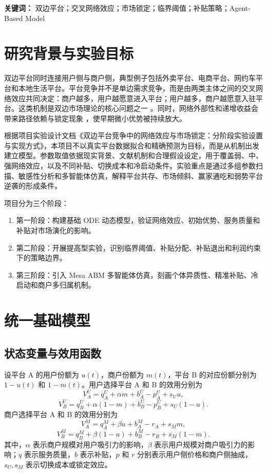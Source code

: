 \documentclass[UTF8,zihao=-4]{ctexart}
\begin{document}
\noindent\textbf{关键词：} 双边平台；交叉网络效应；市场锁定；临界阈值；补贴策略；Agent-Based Model

\section{研究背景与实验目标}

双边平台同时连接用户侧与商户侧，典型例子包括外卖平台、电商平台、网约车平台和本地生活平台。平台竞争并不是单边需求竞争，而是由两类主体之间的交叉网络效应共同决定：商户越多，用户越愿意进入平台；用户越多，商户越愿意入驻平台。这类机制是双边市场理论的核心问题之一 \cite{rochet2003,armstrong2006,parker2005}。同时，网络外部性和递增收益会带来路径依赖与锁定现象 \cite{katz1985,arthur1989}，使早期微小优势被持续放大。

根据项目实验设计文档《双边平台竞争中的网络效应与市场锁定：分阶段实验设置与实现方式》，本项目不以真实平台数据拟合和精确预测为目标，而是从机制出发建立模型。参数取值依据现实背景、文献机制和合理假设设定，用于覆盖弱、中、强网络效应，以及不同补贴、切换成本和冷启动条件。实验重点是通过多组参数扫描、敏感性分析和多智能体仿真，解释平台共存、市场倾斜、赢家通吃和弱势平台逆袭的形成条件。

项目分为三个阶段：
\begin{enumerate}
  \item 第一阶段：构建基础 ODE 动态模型，验证网络效应、初始优势、服务质量和补贴对市场演化的影响。
  \item 第二阶段：开展提高型实验，识别临界阈值、补贴分配、补贴退出和利润约束下的策略边界。
  \item 第三阶段：引入 Mesa ABM 多智能体仿真，刻画个体异质性、精准补贴、冷启动和商户多归属机制。
\end{enumerate}

\section{统一基础模型}

\subsection{状态变量与效用函数}

设平台 A 的用户份额为 $u(t)$，商户份额为 $m(t)$，平台 B 的对应份额分别为 $1-u(t)$ 和 $1-m(t)$。用户选择平台 A 和 B 的效用分别为
\begin{equation}
V_A^U=q_A^U+\alpha m+b_A^U-p_A^U+s_Uu,
\end{equation}
\begin{equation}
V_B^U=q_B^U+\alpha(1-m)+b_B^U-p_B^U+s_U(1-u).
\end{equation}
商户选择平台 A 和 B 的效用分别为
\begin{equation}
V_A^M=q_A^M+\beta u+b_A^M-r_A+s_Mm,
\end{equation}
\begin{equation}
V_B^M=q_B^M+\beta(1-u)+b_B^M-r_B+s_M(1-m).
\end{equation}
其中，$\alpha$ 表示商户规模对用户吸引力的影响，$\beta$ 表示用户规模对商户吸引力的影响；$q$ 表示服务质量，$b$ 表示补贴，$p$ 和 $r$ 分别表示用户侧价格和商户侧抽成，$s_U,s_M$ 表示切换成本或锁定效应。
\end{document}
